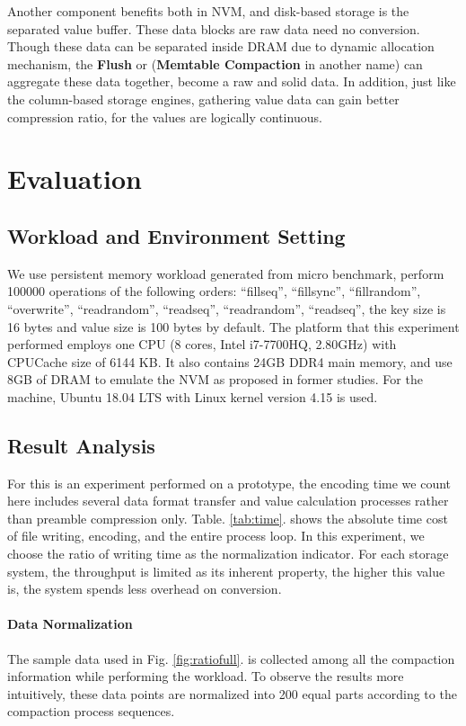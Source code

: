 Another component benefits both in NVM, and disk-based storage is the separated value buffer. These data blocks are raw data need no conversion. Though these data can be separated inside DRAM due to dynamic allocation mechanism, the \textbf{Flush} or (\textbf{Memtable Compaction} in another name) can aggregate these data together, become a raw and solid data. In addition, just like the column-based storage engines, gathering value data can gain better compression ratio, for the values are logically continuous.

\section{Evaluation}


\subsection{Workload and Environment Setting}

We use persistent memory workload generated from micro benchmark, perform 100000 operations of the following orders: ``fillseq'', ``fillsync'', ``fillrandom'', ``overwrite'', ``readrandom'', ``readseq'', ``readrandom'', ``readseq'', the key size is 16 bytes and value size is 100 bytes by default. The platform that this experiment performed employs one CPU (8 cores, Intel i7-7700HQ, 2.80GHz) with CPUCache size of 6144 KB. It also contains 24GB DDR4 main memory, and use 8GB of DRAM to emulate the NVM as proposed in former studies\cite{kannan2018redesigning,kaiyrakhmet2019slm}. For the machine, Ubuntu 18.04 LTS with Linux kernel version 4.15 is used.

\subsection{Result Analysis} 
For this is an experiment performed on a prototype, the encoding time we count here includes several data format transfer and value calculation processes rather than preamble compression only. Table. \ref{tab:time}. shows the absolute time cost of file writing, encoding, and the entire process loop. In this experiment, we choose the ratio of writing time as the normalization indicator. For each storage system, the throughput is limited as its inherent property, the higher this value is, the system spends less overhead on conversion.

\paragraph{Data Normalization} The sample data used in Fig. \ref{fig:ratiofull}. is collected among all the compaction information while performing the workload. To observe the results more intuitively, these data points are normalized into 200 equal parts according to the compaction process sequences. 

